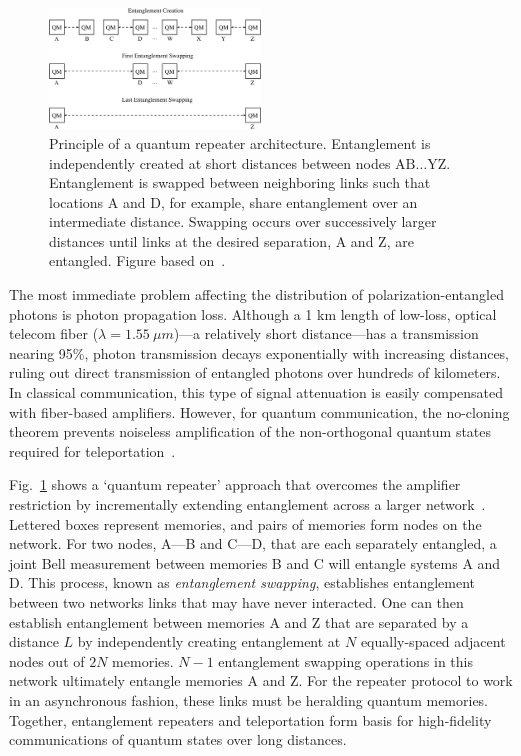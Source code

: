 \documentclass[aps,twocolumn,secnumarabic,amsmath,amssymb,pra,groupedaddress,
showpacs, showkeys,draft]{revtex4-1}
\begin{document}
\begin{figure}[t]
\centering
\includegraphics[width=0.50\textwidth]{figures/connection.pdf}
\caption{\label{fig:chap1:connection} Principle of a quantum repeater architecture. Entanglement is independently created at short distances between nodes $\textrm{AB}\ldots\textrm{YZ}$. Entanglement is swapped between neighboring links such that locations A and D, for example, share entanglement over an intermediate distance. Swapping occurs over successively larger distances until links at the desired separation, A and Z, are entangled. Figure based on~\cite{2009arXiv0906.2699S}.}
\end{figure}

The most immediate problem affecting the distribution of polarization-entangled
photons is photon propagation loss. Although a 1 km length of low-loss, optical
telecom fiber ($\lambda = 1.55~\mu m$)---a relatively short distance---has a
transmission nearing 95\%, photon transmission decays exponentially with
increasing distances, ruling out direct transmission of entangled photons over
hundreds of kilometers. In classical communication, this type of signal
attenuation is easily compensated with fiber-based amplifiers. However, for
quantum communication, the no-cloning theorem prevents noiseless amplification
of the non-orthogonal quantum states required for
teleportation~\cite{citeulike:507853}.

Fig.~\ref{fig:chap1:connection} shows a `quantum repeater' approach that
overcomes the amplifier restriction by incrementally extending entanglement
across a larger network~\cite{2009arXiv0906.2699S}. Lettered boxes represent
memories, and pairs of memories form nodes on the network. For two nodes, A---B
and C---D, that are each separately entangled, a joint Bell measurement between
memories B and C will entangle systems A and D. This process, known as
\emph{entanglement swapping}, establishes entanglement between two networks
links that may have never interacted. One can then establish entanglement
between memories A and Z that are separated by a distance $L$ by independently
creating entanglement at $N$ equally-spaced adjacent nodes out of $2N$
memories. $N-1$ entanglement swapping operations in this network ultimately
entangle memories A and Z. For the repeater protocol to work in an asynchronous
fashion, these links must be heralding quantum memories. Together,
entanglement repeaters and teleportation form basis for high-fidelity
communications of quantum states over long distances.
\end{document}
